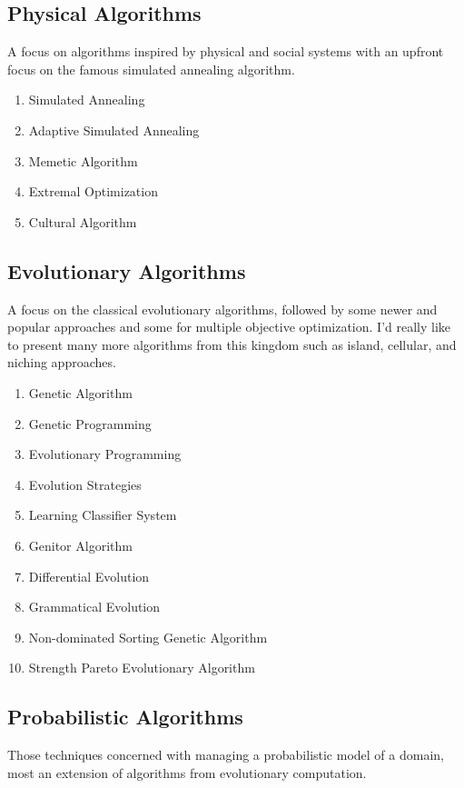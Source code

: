 \documentclass[a4paper, 11pt]{article}
\begin{document}
\subsection{Physical Algorithms}
A focus on algorithms inspired by physical and social systems with an upfront focus on the famous simulated annealing algorithm.

\begin{enumerate}
	\item Simulated Annealing
	\item Adaptive Simulated Annealing
	\item Memetic Algorithm	
	\item Extremal Optimization
	\item Cultural Algorithm
\end{enumerate}

\subsection{Evolutionary Algorithms}
A focus on the classical evolutionary algorithms, followed by some newer and popular approaches and some for multiple objective optimization. I'd really like to present many more algorithms from this kingdom such as island, cellular, and niching approaches.

\begin{enumerate}
	\item Genetic Algorithm
	\item Genetic Programming
	\item Evolutionary Programming
	\item Evolution Strategies
	\item Learning Classifier System
	\item Genitor Algorithm
	\item Differential Evolution
	\item Grammatical Evolution
	\item Non-dominated Sorting Genetic Algorithm
	\item Strength Pareto Evolutionary Algorithm
\end{enumerate}

\subsection{Probabilistic Algorithms}
Those techniques concerned with managing a probabilistic model of a domain, most an extension of algorithms from evolutionary computation.
\end{document}
